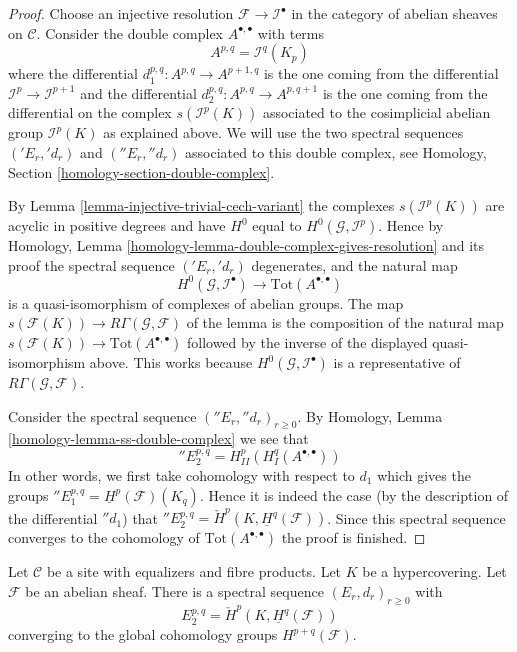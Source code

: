 \begin{proof}
Choose an injective resolution $\mathcal{F} \to \mathcal{I}^\bullet$
in the category of abelian sheaves on $\mathcal{C}$. Consider the
double complex $A^{\bullet, \bullet}$ with terms
$$
A^{p, q} = \mathcal{I}^q(K_p)
$$
where the differential $d_1^{p, q} : A^{p, q} \to A^{p + 1, q}$
is the one coming from the differential $\mathcal{I}^p \to \mathcal{I}^{p + 1}$
and the differential $d_2^{p, q} : A^{p, q} \to A^{p, q + 1}$ is the
one coming from the differential on the complex
$s(\mathcal{I}^p(K))$ associated to the cosimplicial abelian group
$\mathcal{I}^p(K)$ as explained above.
We will use the two spectral
sequences $({}'E_r, {}'d_r)$ and $({}''E_r, {}''d_r)$
associated to this double complex, see
Homology, Section \ref{homology-section-double-complex}.

\medskip\noindent
By Lemma \ref{lemma-injective-trivial-cech-variant} the complexes
$s(\mathcal{I}^p(K))$ are acyclic in positive degrees and have
$H^0$ equal to $H^0(\mathcal{G}, \mathcal{I}^p)$. Hence by
Homology, Lemma \ref{homology-lemma-double-complex-gives-resolution}
and its proof the spectral sequence $({}'E_r, {}'d_r)$ degenerates,
and the natural map
$$
H^0(\mathcal{G}, \mathcal{I}^\bullet) \longrightarrow
\text{Tot}(A^{\bullet, \bullet})
$$
is a quasi-isomorphism of complexes of abelian groups. The map
$s(\mathcal{F}(K)) \longrightarrow R\Gamma(\mathcal{G}, \mathcal{F})$
of the lemma is the composition of the natural map
$s(\mathcal{F}(K)) \to \text{Tot}(A^{\bullet, \bullet})$
followed by the inverse of the displayed quasi-isomorphism above.
This works because $H^0(\mathcal{G}, \mathcal{I}^\bullet)$
is a representative of $R\Gamma(\mathcal{G}, \mathcal{F})$.

\medskip\noindent
Consider the spectral sequence $({}''E_r, {}''d_r)_{r \geq 0}$. By
Homology, Lemma \ref{homology-lemma-ss-double-complex}
we see that
$$
{}''E_2^{p, q} = H^p_{II}(H^q_I(A^{\bullet, \bullet}))
$$
In other words, we first take cohomology with respect to
$d_1$ which gives the groups
${}''E_1^{p, q} = \underline{H}^p(\mathcal{F})(K_q)$.
Hence it is indeed the case (by the description of the differential
${}''d_1$) that
${}''E_2^{p, q} = \check{H}^p(K, \underline{H}^q(\mathcal{F}))$.
Since this spectral sequence converges to the cohomology of
$\text{Tot}(A^{\bullet, \bullet})$ the proof is finished.
\end{proof}

\begin{lemma}
\label{lemma-cech-spectral-sequence-verdier}
Let $\mathcal{C}$ be a site with equalizers and fibre products.
Let $K$ be a hypercovering.
Let $\mathcal{F}$ be an abelian sheaf. There is a
spectral sequence $(E_r, d_r)_{r \geq 0}$ with
$$
E_2^{p, q} = \check{H}^p(K, \underline{H}^q(\mathcal{F}))
$$
converging to the global cohomology groups $H^{p + q}(\mathcal{F})$.
\end{lemma}

